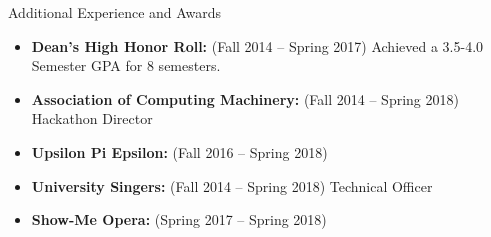 \documentclass[]{mcdowellcv}
\begin{document}
    \begin{cvsection}{Additional Experience and Awards}
        \begin{cvsubsection}{}{}{}	
            \begin{itemize}
                \item \textbf{Dean's High Honor Roll:}  (Fall 2014 -- Spring 2017) Achieved a 3.5-4.0 Semester GPA for 8 semesters.
                \item \textbf{Association of Computing Machinery:} (Fall 2014 -- Spring 2018) Hackathon Director
                \item \textbf{Upsilon Pi Epsilon:}  (Fall 2016 -- Spring 2018)
                \item \textbf{University Singers:} (Fall 2014 -- Spring 2018) Technical Officer
                \item \textbf{Show-Me Opera:} (Spring 2017 -- Spring 2018)
            \end{itemize}
        \end{cvsubsection}
    \end{cvsection}
\end{document}
